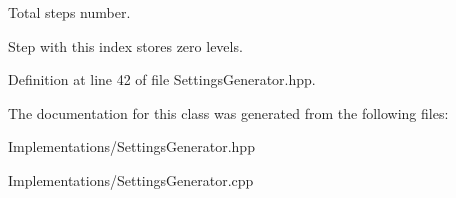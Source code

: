 Total steps number. 

Step with this index stores zero levels. 

Definition at line 42 of file Settings\+Generator.\+hpp.



The documentation for this class was generated from the following files\+:\begin{DoxyCompactItemize}
\item 
Implementations/Settings\+Generator.\+hpp\item 
Implementations/Settings\+Generator.\+cpp\end{DoxyCompactItemize}
